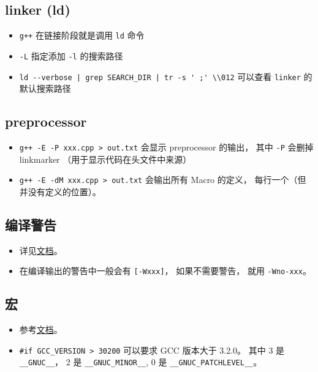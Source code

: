 \subsection{linker (ld)}
\begin{itemize}
\item \verb`g++` 在链接阶段就是调用 \verb`ld` 命令
\item \verb`-L` 指定添加 \verb`-l` 的搜索路径
\item \verb`ld --verbose | grep SEARCH_DIR | tr -s ' ;' \\012` 可以查看 \verb`linker` 的默认搜索路径
\end{itemize}

\subsection{preprocessor}
\begin{itemize}
\item \verb`g++ -E -P xxx.cpp > out.txt` 会显示 preprocessor 的输出， 其中 \verb`-P` 会删掉 linkmarker （用于显示代码在头文件中来源）
\item \verb`g++ -E -dM xxx.cpp > out.txt` 会输出所有 Macro 的定义， 每行一个（但并没有定义的位置）。
\end{itemize}

\subsection{编译警告}
\begin{itemize}
\item 详见\href{https://gcc.gnu.org/onlinedocs/gcc/Warning-Options.html}{文档}。
\item 在编译输出的警告中一般会有 \verb`[-Wxxx]`， 如果不需要警告， 就用 \verb`-Wno-xxx`。
\end{itemize}

\subsection{宏}
\begin{itemize}
\item 参考\href{https://gcc.gnu.org/onlinedocs/cpp/Common-Predefined-Macros.html}{文档}。
\item \verb`#if GCC_VERSION > 30200` 可以要求 GCC 版本大于 3.2.0。 其中 3 是 \verb`__GNUC__`， 2 是 \verb`__GNUC_MINOR__`,  0 是 \verb`__GNUC_PATCHLEVEL__`。
\end{itemize}

